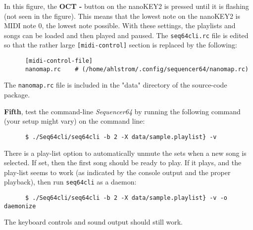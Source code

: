    In this figure, the \textbf{OCT -} button on the nanoKEY2 is pressed until
   it is flashing (not seen in the figure).
   This means that the lowest note on the nanoKEY2 is MIDI note 0, the lowest
   note possible.  With these settings, the playlists and songs can be loaded
   and then played and paused.
   The \texttt{seq64cli.rc} file is edited so that the rather large
   \texttt{[midi-control]} section is replaced by the following:

   \begin{verbatim}
      [midi-control-file]
      nanomap.rc    # (/home/ahlstrom/.config/sequencer64/nanomap.rc)
   \end{verbatim}

   The \texttt{nanomap.rc} file is included in the "data" directory of the
   source-code package.

   \textbf{Fifth}, test the command-line \textsl{Sequencer64} by running the
   following command (your setup might vary) on the command line:

   \begin{verbatim}
      $ ./Seq64cli/seq64cli -b 2 -X data/sample.playlist} -v
   \end{verbatim}

   There is a play-list option to automatically unmute the sets when a new song
   is selected.  If set, then the first song should be ready to play.
   If it plays, and the play-list seems to work (as indicated by the console
   output and the proper playback), then run \texttt{seq64cli} as a daemon:

   \begin{verbatim}
      $ ./Seq64cli/seq64cli -b 2 -X data/sample.playlist} -v -o daemonize
   \end{verbatim}

   The keyboard controls and sound output should still work.

